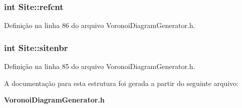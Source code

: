 \subsubsection[{refcnt}]{\setlength{\rightskip}{0pt plus 5cm}int Site\+::refcnt}\label{struct_site_a20f41dc0653332dd930a13327fa8292e}


Definição na linha 86 do arquivo Voronoi\+Diagram\+Generator.\+h.

\subsubsection[{sitenbr}]{\setlength{\rightskip}{0pt plus 5cm}int Site\+::sitenbr}\label{struct_site_aa5ec491ad3d019342ee18c34dabc2c23}


Definição na linha 85 do arquivo Voronoi\+Diagram\+Generator.\+h.



A documentação para esta estrutura foi gerada a partir do seguinte arquivo\+:\begin{DoxyCompactItemize}
\item 
{\bf Voronoi\+Diagram\+Generator.\+h}\end{DoxyCompactItemize}
